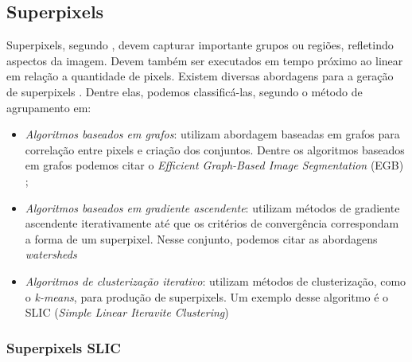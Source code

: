 \begin{document}

\subsection{Superpixels} \label{ssec:super}


Superpixels, segundo \cite{FELZENSZWALB}, devem capturar importante grupos ou regiões, refletindo aspectos da imagem. Devem também ser executados em tempo próximo ao linear em relação a quantidade de pixels. Existem diversas abordagens para a geração de superpixels \cite{SLIC}. Dentre elas, podemos classificá-las, segundo o método de agrupamento em: 

\begin{itemize}
 \item \textit{Algoritmos baseados em grafos}: utilizam abordagem baseadas em grafos para correlação entre pixels e criação dos conjuntos. Dentre os algoritmos baseados em grafos podemos citar o \textit{Efficient Graph-Based Image Segmentation} (EGB) \cite{FELZENSZWALB};
 \item \textit{Algoritmos baseados em gradiente ascendente}: utilizam métodos de gradiente ascendente iterativamente até que os critérios de convergência correspondam a forma de um superpixel. Nesse conjunto, podemos  citar as abordagens \textit{watersheds} \cite{WATERSHEDS} \cite{SLIC}
 \item \textit{Algoritmos de clusterização iterativo}: utilizam métodos de clusterização, como o \textit{k-means}, para produção de superpixels. Um exemplo desse algoritmo é o SLIC (\textit{Simple Linear Iteravite Clustering}) \cite{SLIC}
\end{itemize}


\subsubsection{Superpixels SLIC} \label{sssec:slic}
\end{document}
